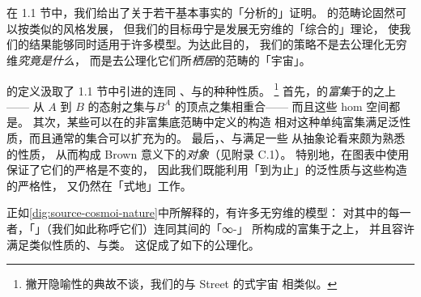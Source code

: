 \providecommand{\Fun}{\operatorname{Fun}}
\providecommand{\Cat}{\mathcal{C}at}
\providecommand{\sSet}{s\mathcal{S}et}
\providecommand{\QCat}{\mathcal{Q}\mathcal{C}at}
\providecommand{\CSS}{\mathcal{CSS}}
\providecommand{\rvEqArrow}{\mathrel{\stackrel{\sim}{\Rightarrow}}}
\providecommand{\rvTfibArrow}{\mathrel{\stackrel{\sim}{\twoheadrightarrow}}}
\section{\trInfinityCosmos}\label{sec:infinity-cosmos}

在 1.1 节中，我们给出了关于\trQuasiCategory{}若干基本事实的「分析的」证明。
\trQuasiCategory{}的范畴论固然可以按类似的风格发展，
但我们的目标毋宁是发展无穷维\trCategory{}的「综合的」理论，
使我们的结果能够同时适用于许多模型。为达此目的，
我们的策略不是去公理化无穷维\trCategory{}\emph{究竟是什么}，
而是去公理化它们所\emph{栖居}的范畴的「宇宙」。

\trInfinityCosmos{}的定义汲取了 1.1 节中引进的\trQuasiCategory{}\trCategory{}连同%
\trIsofibration{}、\trEquivalence{}与\trTrivialFibration{}的种种性质。%
\footnote{撇开隐喻性的典故不谈，我们的\trInfinityCosmos{}与
Street 的\trFibration{}式宇宙 \cite{bib117} 相类似。}
首先，\trQuasiCategory{}的\trCategory{}\emph{富集}于\trSimplicialSet{}的\trCategory{}之上——
从 $A$ 到 $B$ 的态射之集与\trSimplicialSet $B^A$ 的顶点之集相重合——
而且这些 hom 空间都是\trQuasiCategory{}。
其次，某些可以在\trQuasiCategory{}的非富集底范畴中定义的\trLimit{}构造
相对这种单纯富集满足泛性质，而且通常的集合\trIsomorphism{}可以扩充为\trSimplicialSet{}的\trIsomorphism{}。
最后，\trIsofibration{}、\trEquivalence{}与\trTrivialFibration{}满足一些
从抽象\trHomotopy{}论看来颇为熟悉的性质，
从而构成 Brown \cite{bib23} 意义下的\emph{\trFibration{}对象\trCategory}（见附录 C.1）。
特别地，在图表中使用\trIsofibration{}保证了它们的严格\trLimit{}是\trEquivalence{}不变的，
因此我们既能利用「到\trIsomorphism{}为止」的泛性质与这些构造的严格\trFunctor{}性，
又仍然在「\trHomotopy{}式地」工作。

正如\cref{dig:source-cosmoi-nature}中所解释的，有许多无穷维\trCategory{}的模型：
对其中的每一者，「\trInfinityCategory」（我们如此称呼它们）连同其间的「∞-\trFunctor」
所构成的\trCategory{}富集于\trQuasiCategory{}之上，
并且容许满足类似性质的\trIsofibration{}、\trEquivalence{}与\trTrivialFibration{}类。
这促成了如下的公理化。

